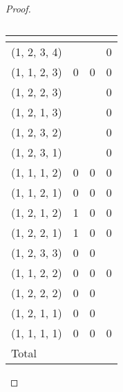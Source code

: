 \documentclass{article}
\begin{document}
\begin{proof}
\begin{table}[h]
\centering
\begin{tabular}{llll}
\multicolumn{1}{l|}{}        &  &  &  \\ \hline
\multicolumn{1}{l|}{(1, 2, 3, 4)} &       &         & 0             \\
\multicolumn{1}{l|}{(1, 1, 2, 3)} & 0             & 0             & 0             \\
\multicolumn{1}{l|}{(1, 2, 2, 3)} &            &              & 0             \\
\multicolumn{1}{l|}{(1, 2, 1, 3)} &            &              & 0             \\
\multicolumn{1}{l|}{(1, 2, 3, 2)} &            &              & 0             \\
\multicolumn{1}{l|}{(1, 2, 3, 1)} &            &              & 0             \\
\multicolumn{1}{l|}{(1, 1, 1, 2)} & 0             & 0             & 0             \\
\multicolumn{1}{l|}{(1, 1, 2, 1)} & 0             & 0             & 0             \\
\multicolumn{1}{l|}{(1, 2, 1, 2)} & 1             & 0             & 0             \\
\multicolumn{1}{l|}{(1, 2, 2, 1)} & 1             & 0             & 0             \\
\multicolumn{1}{l|}{(1, 2, 3, 3)} & 0             & 0             &         \\
\multicolumn{1}{l|}{(1, 1, 2, 2)} & 0             & 0             & 0             \\
\multicolumn{1}{l|}{(1, 2, 2, 2)} & 0             & 0             &              \\
\multicolumn{1}{l|}{(1, 2, 1, 1)} & 0             & 0             &              \\
\multicolumn{1}{l|}{(1, 1, 1, 1)} & 0             & 0             & 0             \\ \hline
\multicolumn{1}{l|}{Total}                             &             &             &            
\end{tabular}
\caption{}
\label{table:mE}
\end{table}


\end{proof}
\end{document}
